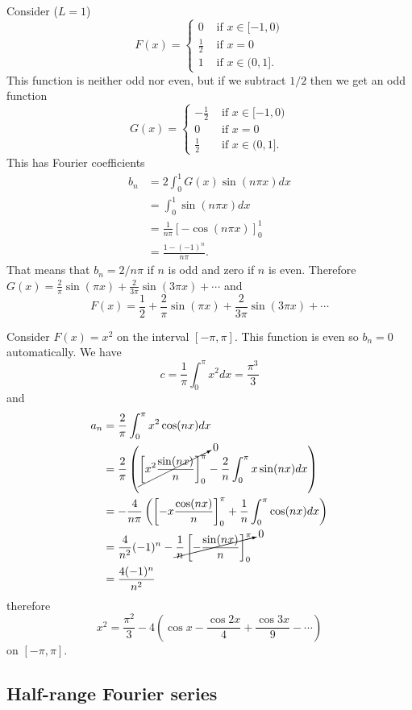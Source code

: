 \begin{exm}
Consider ($L=1$)
\[F(x)=\begin{cases}0&\mbox{ if }x\in[-1,0)\\ \tfrac{1}{2}&\mbox{ if }x=0\\1&\mbox{ if }x\in(0,1].\end{cases}\]
This function is neither odd nor even, but if we subtract $1/2$ then we get an odd function
\[G(x)=\begin{cases}-\tfrac{1}{2}&\mbox{ if }x\in[-1,0)\\ 0&\mbox{ if }x=0\\\tfrac{1}{2}&\mbox{ if }x\in(0,1].\end{cases}\]
This has Fourier coefficients
\begin{align*}
b_n&=2\int_0^1G(x)\sin(n\pi x)dx\\
   &=\int_0^1\sin(n\pi x)dx\\
   &=\frac{1}{n\pi}[-\cos(n\pi x)]_0^1\\
   &=\frac{1-(-1)^n}{n\pi}.
\end{align*}
That means that $b_n=2/n\pi$ if $n$ is odd and zero if $n$ is even. Therefore $G(x)=\frac{2}{\pi}\sin(\pi x)+\frac{2}{3\pi}\sin(3\pi x)+\cdots$ and
\[F(x)=\frac{1}{2}+\frac{2}{\pi}\sin(\pi x)+\frac{2}{3\pi}\sin(3\pi x)+\cdots\]
\end{exm}

\begin{exm}\label{exm:fxequalsxsquared}
Consider $F(x)=x^2$ on the interval $[-\pi,\pi]$. This function is even so $b_n=0$ automatically. We have
\[c=\frac{1}{\pi}\int_0^{\pi}x^2dx=\frac{\pi^3}{3}\]
and
\begin{align*}
a_n&=\frac{2}{\pi}\int_0^{\pi}x^2\cos(nx)dx\\
   &=\frac{2}{\pi}\left(\cancelto{0}{\left[x^2\frac{\sin(nx)}{n}\right]_0^{\pi}}-\frac{2}{n}\int_0^{\pi}x\sin(nx)dx\right)\\
   &=-\frac{4}{n\pi}\left(\left[-x\frac{\cos(nx)}{n}\right]_0^{\pi}+\frac{1}{n}\int_0^{\pi}\cos(nx)dx\right)\\
   &=\frac{4}{n^2}(-1)^n-\cancelto{0}{\frac{1}{n}\left[-\frac{\sin(nx)}{n}\right]_0^{\pi}}\\
   &=\frac{4(-1)^n}{n^2}
\end{align*}
therefore
\[x^2=\frac{\pi^2}{3}-4\left(\cos x-\frac{\cos 2x}{4}+\frac{\cos 3x}{9}-\cdots\right)\]
on $[-\pi,\pi]$.
\end{exm}

\subsection{Half-range Fourier series}


